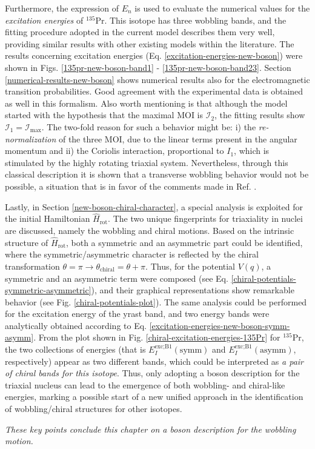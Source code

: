 Furthermore, the expression of $E_n$ is used to evaluate the numerical values for the \emph{excitation energies} of $^{135}$Pr. This isotope has three wobbling bands, and the fitting procedure adopted in the current model describes them very well, providing similar results with other existing models within the literature. The results concerning excitation energies (Eq. \ref{excitation-energies-new-boson}) were shown in Figs. \ref{135pr-new-boson-band1} - \ref{135pr-new-boson-band23}. Section \ref{numerical-results-new-boson} shows numerical results also for the electromagnetic transition probabilities. Good agreement with the experimental data is obtained as well in this formalism. Also worth mentioning is that although the model started with the hypothesis that the maximal MOI is $\mathcal{I}_2$, the fitting results show $\mathcal{I}_1=\mathcal{I}_\text{max}$. The two-fold reason for such a behavior might be: i) the \emph{re-normalization} of the three MOI, due to the linear terms present in the angular momentum and ii) the Coriolis interaction, proportional to $I_1$, which is stimulated by the highly rotating triaxial system. Nevertheless, through this classical description it is shown that a transverse wobbling behavior would not be possible, a situation that is in favor of the comments made in Ref. \cite{frauendorf2018comment}.

Lastly, in Section \ref{new-boson-chiral-character}, a special analysis is exploited for the initial Hamiltonian $\hat{H}_\text{rot}$. The two unique fingerprints for triaxiality in nuclei are discussed, namely the wobbling and chiral motions. Based on the intrinsic structure of $\hat{H}_\text{rot}$, both a symmetric and an asymmetric part could be identified, where the symmetric/asymmetric character is reflected by the chiral transformation $\theta=\pi\longrightarrow\theta_\text{chiral}=\theta+\pi$. Thus, for the potential $V(q)$, a symmetric and an asymmetric term were composed (see Eq. \ref{chiral-potentials-symmetric-asymmetric}), and their graphical representations show remarkable behavior (see Fig. \ref{chiral-potentials-plot}). The same analysis could be performed for the excitation energy of the yrast band, and two energy bands were analytically obtained according to Eq. \ref{excitation-energies-new-boson-symm-asymm}. From the plot shown in Fig. \ref{chiral-excitation-energies-135Pr} for $^{135}$Pr, the two collections of energies (that is $E_I^\text{exc;B1}(\text{symm})$ and $E_I^\text{exc;B1}(\text{asymm})$, respectively) appear as two different bands, which could be interpreted as \emph{a pair of chiral bands for this isotope}. Thus, only adopting a boson description for the triaxial nucleus can lead to the emergence of both wobbling- and chiral-like energies, marking a possible start of a new unified approach in the identification of wobbling/chiral structures for other isotopes.

\emph{These key points conclude this chapter on a boson description for the wobbling motion.}
